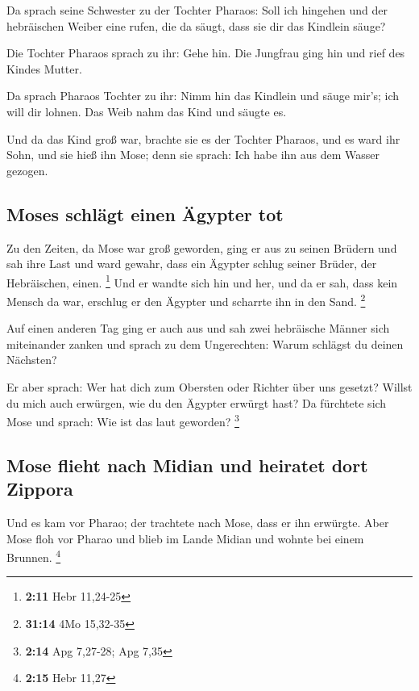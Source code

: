  Da sprach seine Schwester zu der Tochter Pharaos: Soll
ich hingehen und der hebräischen Weiber eine rufen, die da säugt, dass
sie dir das Kindlein säuge?

 Die Tochter Pharaos sprach zu ihr: Gehe hin. Die Jungfrau
ging hin und rief des Kindes Mutter.

 Da sprach Pharaos Tochter zu ihr: Nimm hin das Kindlein
und säuge mir's; ich will dir lohnen. Das Weib nahm das Kind und säugte
es.

 Und da das Kind groß war, brachte sie es der Tochter
Pharaos, und es ward ihr Sohn, und sie hieß ihn Mose; denn sie sprach:
Ich habe ihn aus dem Wasser gezogen.

\hypertarget{moses-schluxe4gt-einen-uxe4gypter-tot}{%
\subsection{Moses schlägt einen Ägypter
tot}\label{moses-schluxe4gt-einen-uxe4gypter-tot}}

 Zu den Zeiten, da Mose war groß geworden, ging er aus zu
seinen Brüdern und sah ihre Last und ward gewahr, dass ein Ägypter
schlug seiner Brüder, der Hebräischen, einen. \footnote{\textbf{2:11}
  Hebr 11,24-25}  Und er wandte sich hin und her, und da
er sah, dass kein Mensch da war, erschlug er den Ägypter und scharrte
ihn in den Sand. \footnote{\textbf{31:14} 4Mo 15,32-35}

 Auf einen anderen Tag ging er auch aus und sah zwei
hebräische Männer sich miteinander zanken und sprach zu dem Ungerechten:
Warum schlägst du deinen Nächsten?

 Er aber sprach: Wer hat dich zum Obersten oder Richter
über uns gesetzt? Willst du mich auch erwürgen, wie du den Ägypter
erwürgt hast? Da fürchtete sich Mose und sprach: Wie ist das laut
geworden? \footnote{\textbf{2:14} Apg 7,27-28; Apg 7,35}

\hypertarget{mose-flieht-nach-midian-und-heiratet-dort-zippora}{%
\subsection{Mose flieht nach Midian und heiratet dort
Zippora}\label{mose-flieht-nach-midian-und-heiratet-dort-zippora}}

 Und es kam vor Pharao; der trachtete nach Mose, dass er
ihn erwürgte. Aber Mose floh vor Pharao und blieb im Lande Midian und
wohnte bei einem Brunnen. \footnote{\textbf{2:15} Hebr 11,27}

